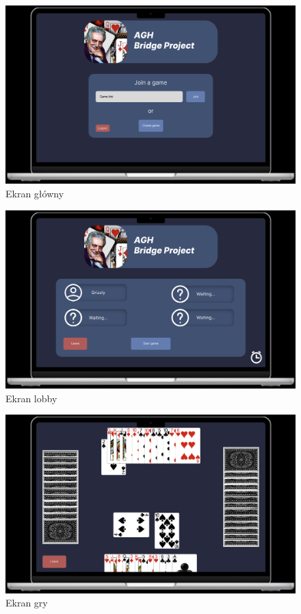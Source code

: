 \begin{figure}[h]
  \centering
  \includegraphics[width=\textwidth]{img/figma-szkic/2.png}
  \caption{Ekran główny}
\end{figure}

\begin{figure}[h]
  \centering
  \includegraphics[width=\textwidth]{img/figma-szkic/3.png}
  \caption{Ekran lobby}
\end{figure}

\begin{figure}[h]
  \centering
  \includegraphics[width=\textwidth]{img/figma-szkic/4.png}
  \caption{Ekran gry}
\end{figure}

